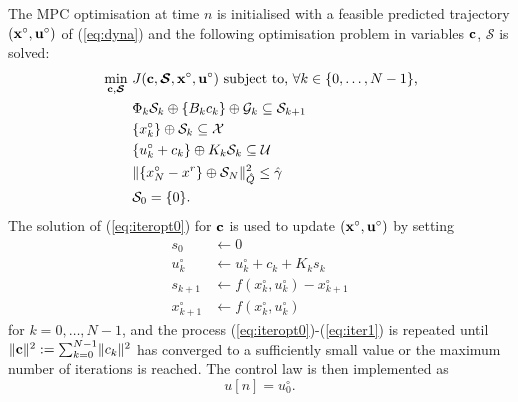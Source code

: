 \documentclass[a4paper, 10 pt, conference]{IEEEconf}
\def\G{\mathcal{G}}
\def\S{\mathcal{S}}
\def\U{\mathcal{U}}
\def\X{\mathcal{X}}
\def\bgamma{\boldsymbol{\gamma}}
\def\bc{{\bf c}}
\def\bS{\boldsymbol{\mathcal{S}}}
\begin{document}
The MPC optimisation at time $n$ is initialised with a feasible predicted trajectory $({\bf x}^\circ, {\bf u}^\circ)$ of (\ref{eq:dyna})
and the following optimisation problem in variables $\bc$, $\bS$ %
is solved:
\begin{equation}\label{eq:iteropt0}
\begin{alignedat}{2}
&  \min_{\bc,\bS} &  \ &   J(\bc,\bS,{\bf x}^\circ,{\bf u}^\circ) 
\ \text{subject to, $\forall k \in \{0, \ldots, N-1\}$,}
\\ 
& & &
\Phi_k \S_k \oplus \{B_k c_k\} \oplus \G_k \subseteq \S_{k+1}
\\
& & & 
\{x_k^\circ\} \oplus \S_k \subseteq \X 
\\
& & &    \{u_k^\circ+c_k\} \oplus K_k \S_k \subseteq \U 
\\
& & &  \lVert \{ x_N^\circ - x^r\} \oplus \S_N \rVert_{\hat{Q}}^2 \leq \hat{\gamma}
\\
& & &    \S_0 = \{0\}.
\end{alignedat}
\end{equation}
%
The solution of (\ref{eq:iteropt0}) for $\bc$ is used to update $({\bf x}^\circ,{\bf u}^\circ)$ by setting%
%
\begin{subequations}\label{eq:iter1}%
\begin{alignat}{2}
s_0 &\gets 0
\\
\label{eq:iter2}
u^\circ_k &\gets u^\circ_k + c_k + K_k s_k
\\
\label{eq:iter3}
s_{k+1} &\gets f(x^\circ_k, u^\circ_k) - x^\circ_{k+1}
\\
\label{eq:iter4}
x^\circ_{k+1} &\gets f(x^\circ_k, u^\circ_k) 
\end{alignat}
\end{subequations}
for $k = 0, \ldots , N-1$, and the process (\ref{eq:iteropt0})-(\ref{eq:iter1}) is repeated until $\lVert \bc \rVert^2 := \sum_{k=0}^{N-1}\lVert c_k\rVert^2$ has converged to a sufficiently small value or the maximum number of iterations is reached. 
%
The control law is then implemented as
\begin{equation}
\label{eq:step_update1}   
u[n] = u^\circ_{0}.
\end{equation}
%
\end{document}
